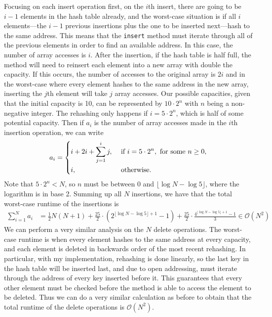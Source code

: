 \documentclass[11pt]{article}
\begin{document}
    Focusing on each insert operation first, on the \(i\)th insert, there are going to be \(i-1\) elements in the hash table already, and the worst-case situation is if all \(i\) elements---the \(i-1\) previous insertions plus the one to be inserted next---hash to the same address. This means that the \texttt{insert} method must iterate through all of the previous elements in order to find an available address. In this case, the number of array accesses is \(i\). After the insertion, if the hash table is half full, the method will need to reinsert each element into a new array with double the capacity. If this occurs, the number of accesses to the original array is \(2i\) and in the worst-case where every element hashes to the same address in the new array, inserting the \(j\)th element will take \(j\) array accesses. Our possible capacities, given that the initial capacity is 10, can be represented by \(10 \cdot 2^n\) with \(n\) being a non-negative integer. The rehashing only happens if \(i = 5 \cdot 2^n\), which is half of some potential capacity. Then if \(a_i\) is the number of array accesses made in the \(i\)th insertion operation, we can write
    \[
        a_i = \begin{dcases}
            i + 2i + \sum_{j=1}^{i} j, &\text{ if } i = 5 \cdot 2^n, \text{ for some }  n \geq 0,\\
            i, &\text{ otherwise} .
        \end{dcases}
    \]
    Note that \(5\cdot 2^n < N\), so \(n\) must be between 0 and \(\lfloor\log N - \log 5\rfloor\), where the logarithm is in base 2. Summing up all \(N\) insertions, we have that the total worst-case runtime of the insertions is
    \begin{align*}
        \sum_{i=1}^{N} a_i &= \frac{1}{2}N(N+1)+\frac{25}{2} \cdot (2^{\lfloor \log N - \log 5\rfloor + 1} - 1) + \frac{25}{2} \cdot \frac{4^{\lfloor \log N - \log 5\rfloor + 1} - 1}{3} \in \mathcal{O} (N^2)
    \end{align*}
    We can perform a very similar analysis on the \(N\) delete operations. The worst-case runtime is when every element hashes to the same address at every capacity, and each element is deleted in backwards order of the most recent rehashing. In particular, with my implementation, rehashing is done linearly, so the last key in the hash table will be inserted last, and due to open addressing, must iterate through the address of every key inserted before it. This guarantees that every other element must be checked before the method is able to access the element to be deleted. Thus we can do a very similar calculation as before to obtain that the total runtime of the delete operations is \(\mathcal{O} (N^2)\).
\end{document}

